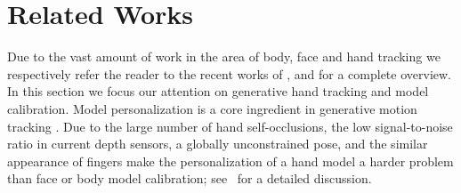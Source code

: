 \section{Related Works}
Due to the vast amount of work in the area of body, face and hand tracking we respectively refer the reader to the recent works of ,  and  for a complete overview. In this section we focus our attention on generative hand tracking and model calibration. Model personalization is a core ingredient in generative motion tracking \cite{pons2011model}.  Due to the large number of hand self-occlusions, the low signal-to-noise ratio in current depth sensors, a globally unconstrained pose, and the similar appearance of fingers make the personalization of a hand model a harder problem than face or body model calibration; see~\cite{supancic2015depth} for a detailed discussion.

